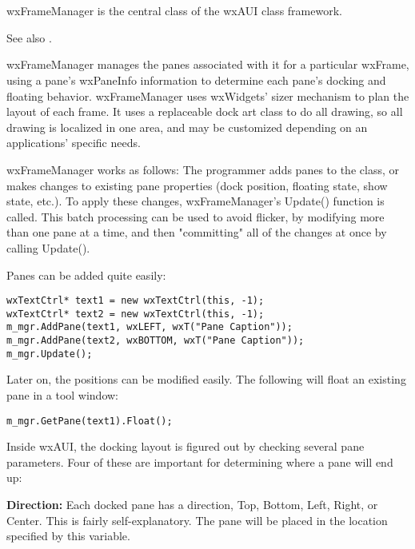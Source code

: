 \section{}\label{wxframemanager}

wxFrameManager is the central class of the wxAUI class framework.

See also .

wxFrameManager manages the panes associated with it
for a particular wxFrame, using a pane's wxPaneInfo information to
determine each pane's docking and floating behavior. wxFrameManager
uses wxWidgets' sizer mechanism to plan the layout of each frame. It
uses a replaceable dock art class to do all drawing, so all drawing is
localized in one area, and may be customized depending on an
applications' specific needs.

wxFrameManager works as follows: The programmer adds panes to the class,
or makes changes to existing pane properties (dock position, floating
state, show state, etc.). To apply these changes, wxFrameManager's
Update() function is called. This batch processing can be used to avoid
flicker, by modifying more than one pane at a time, and then "committing"
all of the changes at once by calling Update().

Panes can be added quite easily:

\begin{verbatim}
wxTextCtrl* text1 = new wxTextCtrl(this, -1);
wxTextCtrl* text2 = new wxTextCtrl(this, -1);
m_mgr.AddPane(text1, wxLEFT, wxT("Pane Caption"));
m_mgr.AddPane(text2, wxBOTTOM, wxT("Pane Caption"));
m_mgr.Update();
\end{verbatim}

Later on, the positions can be modified easily. The following will float
an existing pane in a tool window:

\begin{verbatim}
m_mgr.GetPane(text1).Float();
\end{verbatim}


Inside wxAUI, the docking layout is figured out by checking several
pane parameters. Four of these are important for determining where a
pane will end up:

{\bf Direction:}
Each docked pane has a direction, Top, Bottom, Left, Right, or
Center. This is fairly self-explanatory. The pane will be placed in the
location specified by this variable.

